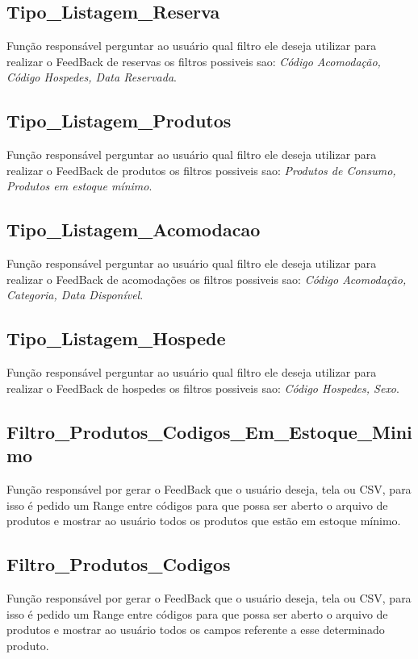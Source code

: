 \documentclass{article}
\begin{document}
\subsection{Tipo\_Listagem\_Reserva}
	Função responsável perguntar ao usuário qual filtro ele deseja utilizar para realizar o FeedBack de reservas os filtros possiveis sao: \textit{Código Acomodação, Código Hospedes, Data Reservada}.

\subsection{Tipo\_Listagem\_Produtos}
	Função responsável perguntar ao usuário qual filtro ele deseja utilizar para realizar o FeedBack de produtos os filtros possiveis sao: \textit{Produtos de Consumo, Produtos em estoque mínimo}.

\subsection{Tipo\_Listagem\_Acomodacao}
	Função responsável perguntar ao usuário qual filtro ele deseja utilizar para realizar o FeedBack de acomodações os filtros possiveis sao: \textit{Código Acomodação, Categoria, Data Disponível}.

\subsection{Tipo\_Listagem\_Hospede}
	Função responsável perguntar ao usuário qual filtro ele deseja utilizar para realizar o FeedBack de hospedes os filtros possiveis sao: \textit{Código Hospedes, Sexo}.

\subsection{Filtro\_Produtos\_Codigos\_Em\_Estoque\_Minimo}
	Função responsável por gerar o FeedBack que o usuário deseja, tela ou CSV, para isso é pedido um Range entre códigos para que possa ser aberto o arquivo de produtos e mostrar ao usuário todos os produtos que estão em estoque mínimo.
	
\subsection{Filtro\_Produtos\_Codigos}
	Função responsável por gerar o FeedBack que o usuário deseja, tela ou CSV, para isso é pedido um Range entre códigos para que possa ser aberto o arquivo de produtos e mostrar ao usuário todos os campos referente a esse determinado produto.
	
\end{document}

